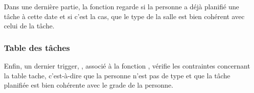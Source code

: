 	Dans une dernière partie, la fonction regarde si la personne a déjà planifié une tâche à cette date et si c'est la cas, que le type de la salle est bien cohérent avec celui de la tâche.

\subsubsection{Table des tâches}
	Enfin, un dernier trigger, , associé à la fonction , vérifie les contraintes concernant la table tache, c'est-à-dire que la personne n'est pas de type  et que la tâche planifiée est bien cohérente avec le grade de la personne.

